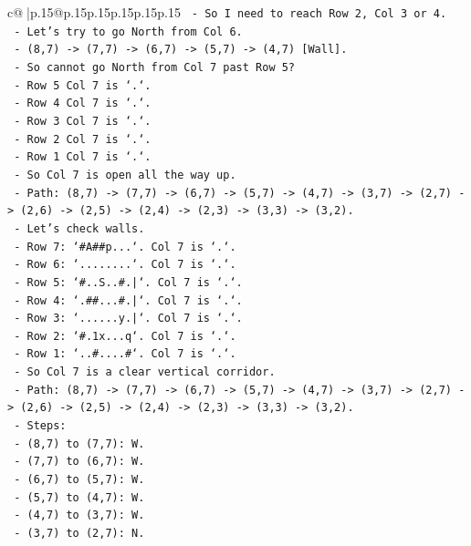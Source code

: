 \documentclass{article}
\begin{document}
{\begin{supertabular}{c@{$\;$}|p{.15\linewidth}@{}p{.15\linewidth}p{.15\linewidth}p{.15\linewidth}p{.15\linewidth}p{.15\linewidth}}
{{{\texttt{  {-} So I need to reach Row 2, Col 3 or 4.} \\
\texttt{  {-} Let's try to go North from Col 6.} \\
\texttt{  {-} (8,7) {-}> (7,7) {-}> (6,7) {-}> (5,7) {-}> (4,7) {[}Wall{]}.} \\
\texttt{  {-} So cannot go North from Col 7 past Row 5?} \\
\texttt{  {-} Row 5 Col 7 is `.`.} \\
\texttt{  {-} Row 4 Col 7 is `.`.} \\
\texttt{  {-} Row 3 Col 7 is `.`.} \\
\texttt{  {-} Row 2 Col 7 is `.`.} \\
\texttt{  {-} Row 1 Col 7 is `.`.} \\
\texttt{  {-} So Col 7 is open all the way up.} \\
\texttt{  {-} Path: (8,7) {-}> (7,7) {-}> (6,7) {-}> (5,7) {-}> (4,7) {-}> (3,7) {-}> (2,7) {-}> (2,6) {-}> (2,5) {-}> (2,4) {-}> (2,3) {-}> (3,3) {-}> (3,2).} \\
\texttt{  {-} Let's check walls.} \\
\texttt{  {-} Row 7: `\#A\#\#p...`. Col 7 is `.`.} \\
\texttt{  {-} Row 6: `........`. Col 7 is `.`.} \\
\texttt{  {-} Row 5: `\#..S..\#.|`. Col 7 is `.`.} \\
\texttt{  {-} Row 4: `.\#\#...\#.|`. Col 7 is `.`.} \\
\texttt{  {-} Row 3: `......y.|`. Col 7 is `.`.} \\
\texttt{  {-} Row 2: `\#.1x...q`. Col 7 is `.`.} \\
\texttt{  {-} Row 1: `..\#....\#`. Col 7 is `.`.} \\
\texttt{  {-} So Col 7 is a clear vertical corridor.} \\
\texttt{  {-} Path: (8,7) {-}> (7,7) {-}> (6,7) {-}> (5,7) {-}> (4,7) {-}> (3,7) {-}> (2,7) {-}> (2,6) {-}> (2,5) {-}> (2,4) {-}> (2,3) {-}> (3,3) {-}> (3,2).} \\
\texttt{  {-} Steps:} \\
\texttt{    {-} (8,7) to (7,7): W.} \\
\texttt{    {-} (7,7) to (6,7): W.} \\
\texttt{    {-} (6,7) to (5,7): W.} \\
\texttt{    {-} (5,7) to (4,7): W.} \\
\texttt{    {-} (4,7) to (3,7): W.} \\
\texttt{    {-} (3,7) to (2,7): N.} \\
}}}
\end{supertabular}}
\end{document}
